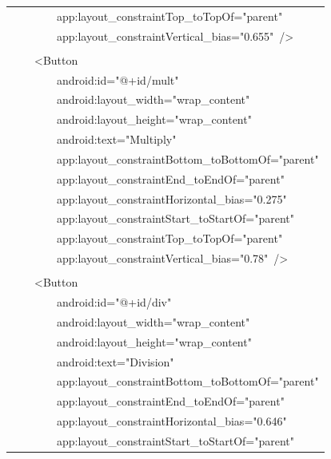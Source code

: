 \documentclass[a4paper,12pt]{article}
\begin{document}
\begin{longtable}{|p{}|}
{\ttfamily\small \ \ \ \ \ \ \ \ app:layout\_constraintTop\_toTopOf="parent"} \\
{\ttfamily\small \ \ \ \ \ \ \ \ app:layout\_constraintVertical\_bias="0.655"\ /\textgreater{}} \\
\strut \\
{\ttfamily\small \ \ \ \ \textless{}Button} \\
{\ttfamily\small \ \ \ \ \ \ \ \ android:id="@+id/mult"} \\
{\ttfamily\small \ \ \ \ \ \ \ \ android:layout\_width="wrap\_content"} \\
{\ttfamily\small \ \ \ \ \ \ \ \ android:layout\_height="wrap\_content"} \\
{\ttfamily\small \ \ \ \ \ \ \ \ android:text="Multiply"} \\
{\ttfamily\small \ \ \ \ \ \ \ \ app:layout\_constraintBottom\_toBottomOf="parent"} \\
{\ttfamily\small \ \ \ \ \ \ \ \ app:layout\_constraintEnd\_toEndOf="parent"} \\
{\ttfamily\small \ \ \ \ \ \ \ \ app:layout\_constraintHorizontal\_bias="0.275"} \\
{\ttfamily\small \ \ \ \ \ \ \ \ app:layout\_constraintStart\_toStartOf="parent"} \\
{\ttfamily\small \ \ \ \ \ \ \ \ app:layout\_constraintTop\_toTopOf="parent"} \\
{\ttfamily\small \ \ \ \ \ \ \ \ app:layout\_constraintVertical\_bias="0.78"\ /\textgreater{}} \\
\strut \\
{\ttfamily\small \ \ \ \ \textless{}Button} \\
{\ttfamily\small \ \ \ \ \ \ \ \ android:id="@+id/div"} \\
{\ttfamily\small \ \ \ \ \ \ \ \ android:layout\_width="wrap\_content"} \\
{\ttfamily\small \ \ \ \ \ \ \ \ android:layout\_height="wrap\_content"} \\
{\ttfamily\small \ \ \ \ \ \ \ \ android:text="Division"} \\
{\ttfamily\small \ \ \ \ \ \ \ \ app:layout\_constraintBottom\_toBottomOf="parent"} \\
{\ttfamily\small \ \ \ \ \ \ \ \ app:layout\_constraintEnd\_toEndOf="parent"} \\
{\ttfamily\small \ \ \ \ \ \ \ \ app:layout\_constraintHorizontal\_bias="0.646"} \\
{\ttfamily\small \ \ \ \ \ \ \ \ app:layout\_constraintStart\_toStartOf="parent"} \\

\end{longtable}
\end{document}
